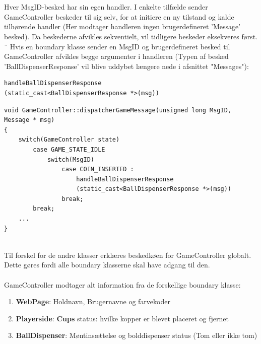 \documentclass[Softwaredesign/Softwaredesign_main.tex]{subfiles}
\begin{document}
\\\\Hver MsgID-besked har sin egen handler. I enkelte tilfælde sender GameController beskeder til sig selv, for at initiere en ny tilstand og kalde tilhørende handler (Her modtager handleren ingen brugerdefineret 'Message' besked). Da beskederne afvikles sekventielt, vil tidligere beskeder eksekveres først. \\¨
Hvis en boundary klasse sender en MsgID og brugerdefineret besked til GameController afvikles begge argumenter i handleren (Typen af besked 'BallDispenserResponse' vil blive uddybet længere nede i afsnittet "Messages"): 
\begin{lstlisting}[caption={Design af handler},label={lst:bound_hand}]
handleBallDispenserResponse
(static_cast<BallDispenserResponse *>(msg)) 
\end{lstlisting}
\begin{lstlisting}
void GameController::dispatcherGameMessage(unsigned long MsgID, 
Message * msg)
{
    switch(GameController state)
        case GAME_STATE_IDLE
            switch(MsgID)
                case COIN_INSERTED : 
                    handleBallDispenserResponse
                    (static_cast<BallDispenserResponse *>(msg)) 
                break;
        break; 
    ...
}
\end{lstlisting}
\\Til forskel for de andre klasser erklæres beskedkøen for GameController globalt. Dette gøres fordi alle boundary klasserne skal have adgang til den. \\\\
GameController modtager alt information fra de forskellige boundary klasse:
\begin{enumerate}
    \item \textbf{WebPage}: Holdnavn, Brugernavne og farvekoder
    \item \textbf{Playerside}: \textbf{Cups} status: hvilke kopper er blevet placeret og fjernet
    \item \textbf{BallDispenser}: Møntinsættelse og bolddispenser status (Tom eller ikke tom)
\end{enumerate}
\end{document}
